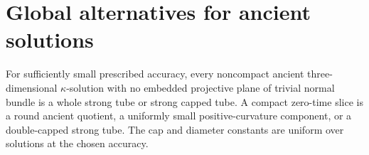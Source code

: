 \section{Global alternatives for ancient solutions}
\label{sec:m26}

\begin{theorem}
\label{thm:neck-cap-ancient-alternatives}
For sufficiently small prescribed accuracy, every noncompact ancient
three-dimensional $\kappa$-solution with no embedded projective plane of
trivial normal bundle is a whole strong tube or strong capped tube.
A compact zero-time slice is a round ancient quotient, a uniformly small
positive-curvature component, or a double-capped strong tube. The cap and
diameter constants are uniform over solutions at the chosen accuracy.
\end{theorem}

